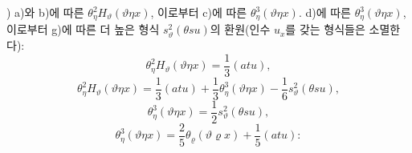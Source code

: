 
) a)와 b)에 따른 $\theta_\eta^2H_\vartheta(\vartheta\eta x)$, 이로부터 c)에 따른 $\theta_\eta^3(\vartheta\eta x)$. d)에 따른 $\theta_\eta^3(\vartheta\eta x)$, 이로부터 g)에 따른 더 높은 형식 $s_\vartheta^2(\theta su)$의 환원(인수 $u_x$를 갖는 형식들은 소멸한다):
\[
\theta_\eta^2H_\vartheta(\vartheta\eta x)=\frac13(atu),
\]
\[
\theta_\eta^2H_\vartheta(\vartheta\eta x)=\frac13(atu)+\frac13\theta_\eta^3(\vartheta\eta x)-\frac16s_\vartheta^2(\theta su),
\]
\[
\theta_\eta^3(\vartheta\eta x)=\frac12s_\vartheta^2(\theta su),
\]
\[
\theta_\eta^3(\vartheta\eta x)=\frac25\theta_\varrho(\vartheta\varrho x)+\frac15(atu):
\]
